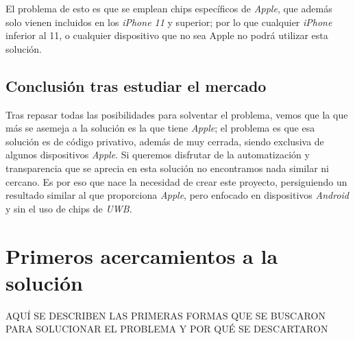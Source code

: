 El problema de esto es que se emplean chips específicos de \emph{Apple}, que
además solo vienen incluidos en los \emph{iPhone 11} y superior; por lo que
cualquier \emph{iPhone} inferior al 11, o cualquier dispositivo que no sea Apple
no podrá utilizar esta solución.

\subsection{Conclusión tras estudiar el mercado}
Tras repasar todas las posibilidades para solventar el problema, vemos que la
que más se asemeja a la solución es la que tiene \emph{Apple}; el problema es
que esa solución es de código privativo, además de muy cerrada, siendo exclusiva
de algunos dispositivos \emph{Apple}. Si queremos disfrutar de la automatización
y transparencia que se aprecia en esta solución no encontramos nada similar ni
cercano. Es por eso que nace la necesidad de crear este proyecto, persiguiendo
un resultado similar al que proporciona \emph{Apple}, pero enfocado en
dispositivos \emph{Android} y sin el uso de chips de \emph{UWB}.\\

\section{Primeros acercamientos a la solución}

AQUÍ SE DESCRIBEN LAS PRIMERAS FORMAS QUE SE BUSCARON PARA SOLUCIONAR EL PROBLEMA Y POR QUÉ SE DESCARTARON